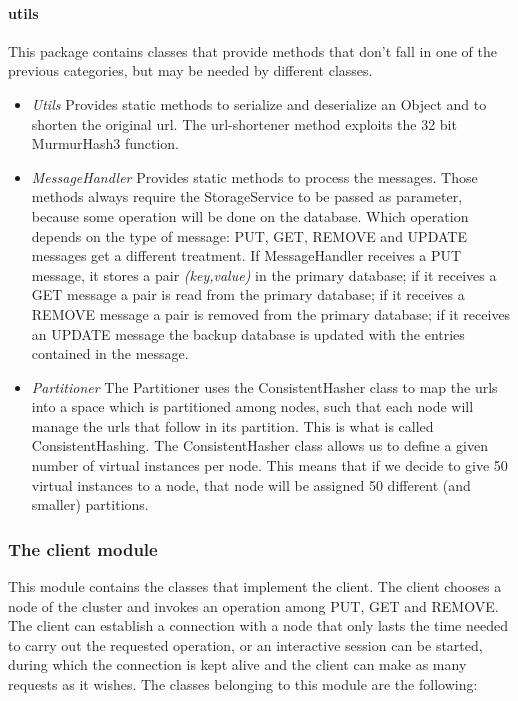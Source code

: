 \documentclass{article}
\begin{document}
\paragraph{utils} This package contains classes that provide methods that don't fall in one of the previous categories, but may be needed by different classes. 
\begin{itemize}
\item \textit{Utils} Provides static methods to serialize and deserialize an Object and to shorten the original url. The url-shortener method exploits the 32 bit MurmurHash3 function.
\item \textit{MessageHandler} Provides static methods to process the messages. Those methods always require the StorageService to be passed as parameter, because some operation will be done on the database. Which operation depends on the type of message: PUT, GET, REMOVE and UPDATE messages get a different treatment. If MessageHandler receives a PUT message, it stores a pair \textit{(key,value)} in the primary database; if it receives a GET message a pair is read from the primary database; if it receives a REMOVE message a pair is removed from the primary database; if it receives an UPDATE message the backup database is updated with the entries contained in the message.
\item \textit{Partitioner} The Partitioner uses the ConsistentHasher class to map the urls into a space which is partitioned among nodes, such that each node will manage the urls that follow in its partition. This is what is called ConsistentHashing. The ConsistentHasher class allows us to define a given number of virtual instances per node. This means that if we decide to give 50 virtual instances to a node, that node will be assigned 50 different (and smaller) partitions.
\end{itemize}



\subsubsection{The client module} 
This module contains the classes that implement the client. The client chooses a node of the cluster and invokes an operation among PUT, GET and REMOVE. The client can establish a connection with a node that only lasts the time needed to carry out the requested operation, or an interactive session can be started, during which the connection is kept alive and the client can make as many requests as it wishes. The classes belonging to this module are the following:
\end{document}
